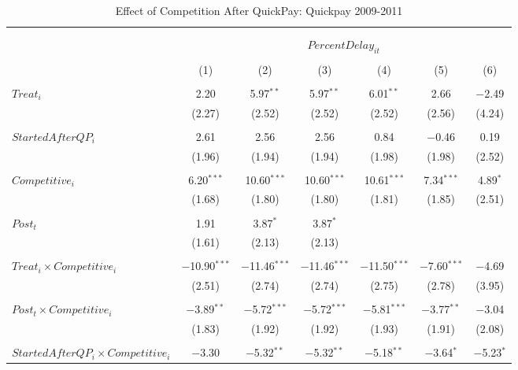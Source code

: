 \documentclass[
]{article}
\begin{document}
\begin{table}[H] \centering 
  \caption{Effect of Competition After QuickPay: Quickpay 2009-2011} 
  \label{} 
\small 
\begin{tabular}{@{\extracolsep{-3pt}}lcccccc} 
\\[-1.8ex]\hline 
\hline \\[-1.8ex] 
\\[-1.8ex] & \multicolumn{6}{c}{$PercentDelay_{it}$  } \\ 
\\[-1.8ex] & (1) & (2) & (3) & (4) & (5) & (6)\\ 
\hline \\[-1.8ex] 
 $Treat_i$ & 2.20 & 5.97$^{**}$ & 5.97$^{**}$ & 6.01$^{**}$ & 2.66 & $-$2.49 \\ 
  & (2.27) & (2.52) & (2.52) & (2.52) & (2.56) & (4.24) \\ 
  & & & & & & \\ 
 $StartedAfterQP_i$ & 2.61 & 2.56 & 2.56 & 0.84 & $-$0.46 & 0.19 \\ 
  & (1.96) & (1.94) & (1.94) & (1.98) & (1.98) & (2.52) \\ 
  & & & & & & \\ 
 $Competitive_i$ & 6.20$^{***}$ & 10.60$^{***}$ & 10.60$^{***}$ & 10.61$^{***}$ & 7.34$^{***}$ & 4.89$^{*}$ \\ 
  & (1.68) & (1.80) & (1.80) & (1.81) & (1.85) & (2.51) \\ 
  & & & & & & \\ 
 $Post_t$ & 1.91 & 3.87$^{*}$ & 3.87$^{*}$ &  &  &  \\ 
  & (1.61) & (2.13) & (2.13) &  &  &  \\ 
  & & & & & & \\ 
 $Treat_i \times Competitive_i$ & $-$10.90$^{***}$ & $-$11.46$^{***}$ & $-$11.46$^{***}$ & $-$11.50$^{***}$ & $-$7.60$^{***}$ & $-$4.69 \\ 
  & (2.51) & (2.74) & (2.74) & (2.75) & (2.78) & (3.95) \\ 
  & & & & & & \\ 
 $Post_t \times Competitive_i$ & $-$3.89$^{**}$ & $-$5.72$^{***}$ & $-$5.72$^{***}$ & $-$5.81$^{***}$ & $-$3.77$^{**}$ & $-$3.04 \\ 
  & (1.83) & (1.92) & (1.92) & (1.93) & (1.91) & (2.08) \\ 
  & & & & & & \\ 
 $StartedAfterQP_i \times Competitive_i$ & $-$3.30 & $-$5.32$^{**}$ & $-$5.32$^{**}$ & $-$5.18$^{**}$ & $-$3.64$^{*}$ & $-$5.23$^{*}$ \\ 

\end{tabular}
\end{table}
\end{document}
